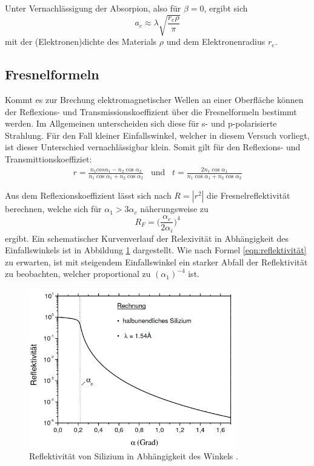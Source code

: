 Unter Vernachlässigung der Absorpion, also für $\beta=0$, ergibt sich
\begin{equation}
  a_c\approx \lambda\sqrt{\frac{r_e \rho}{\pi}}
  \label{eqn:alphac}
\end{equation}
mit der (Elektronen)dichte des Materials $\rho$ und dem Elektronenradius $r_e$.

\subsection{Fresnelformeln}
Kommt es zur Brechung elektromagnetischer Wellen an einer Oberfläche können der Reflexions- und
Transmissionskoeffizient über die Fresnelformeln bestimmt werden. Im Allgemeinen unterscheiden
sich diese für s- und p-polarisierte Strahlung. Für den Fall kleiner Einfallswinkel, welcher in diesem Versuch
vorliegt, ist dieser Unterschied vernachlässigbar klein.
Somit gilt für den Reflexions- und Transmittionskoeffiziet:
\begin{align}
 r=\frac{n_1cos \alpha_1 -n_2 \cos\alpha_2}{n_1\cos\alpha_1 + n_2 \cos\alpha_2}\;\;\; \text{und}\;\;\; t=\frac{2n_1 \cos\alpha_1}{n_1\cos\alpha_1 + n_2 \cos\alpha_2}
\end{align}

Aus dem Reflexionskoeffizient lässt sich nach $R=|r^2|$ die Fresnelreflektivität berechnen, welche sich
für $\alpha_1>3\alpha_c$ näherungsweise zu
\begin{equation}
  R_F=\Big(\frac{\alpha_c}{2\alpha_i} \Big)^4
  \label{eqn:reflektivität}
\end{equation}
ergibt. Ein schematischer Kurvenverlauf der Relexivität in Abhängigkeit des Einfallswinkels ist in
Abbildung \ref{fig:reflex} dargestellt. Wie nach Formel \ref{eqn:reflektivität} zu erwarten, ist mit steigendem
Einfallswinkel ein starker Abfall der Reflektivität zu beobachten, welcher proportional zu $(\alpha_1)^{-4}$ ist.

\begin{figure}
  \centering
  \includegraphics[width=9cm]{Reflektivität.png}
  \caption{Reflektivität von Silizium in Abhängigkeit des Winkels \cite{XSR}.}
  \label{fig:reflex}
\end{figure}


